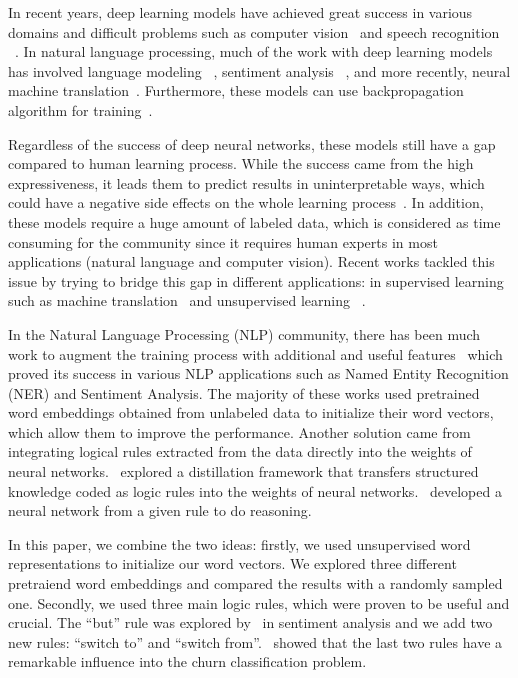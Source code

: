 \documentclass[11pt,letterpaper]{article}
\begin{document}
In recent years, deep learning models have achieved great success in various domains and difficult problems such as computer vision~\cite{krizhevsky} and speech recognition ~\cite{dahl,hinton2012}. In natural language processing, much of the work with deep learning models has involved language modeling ~\cite{bengio2003,mikolov2013}, sentiment analysis ~\cite{socher2013}, and more recently, neural machine translation~\cite{cho,sutskever}. Furthermore, these models can use backpropagation algorithm for training~\cite{rumelhart1988}.

Regardless of the success of deep neural networks, these models still have a gap compared to human learning process. While the success came from the high expressiveness, it leads them to predict results in uninterpretable ways, which could have a negative side effects on the whole learning process~\cite{szegedy,nguyen2015}. In addition, these models require a huge amount of labeled data, which is considered as time consuming for the community since it requires human experts in most applications (natural language and computer vision). Recent works tackled this issue by trying to bridge this gap in different applications: in supervised learning such as machine translation~\cite{wu2016google} and unsupervised learning ~\cite{bengio2015}.

In the Natural Language Processing (NLP) community, there has been much work to augment the training process with additional and useful features~\cite{collobert} which proved its success in various NLP applications such as Named Entity Recognition (NER) and Sentiment Analysis. The majority of these works used pretrained word embeddings obtained from unlabeled data to initialize their word vectors, which allow them to improve the performance. Another solution came from integrating logical rules extracted from the data directly into the weights of neural networks.~\cite{hu} explored a distillation framework that transfers structured knowledge coded as logic rules into the weights of neural networks.~\cite{garcez2012neural} developed a neural network from a given rule to do reasoning. 

In this paper, we combine the two ideas: firstly, we used unsupervised word representations to initialize our word vectors. We explored three different pretraiend word embeddings and compared the results with a randomly sampled one. Secondly, we used three main logic rules, which were proven to be useful and crucial. The \enquote{but} rule was explored by~\cite{hu} in sentiment analysis and we add two new rules: \enquote{switch to} and \enquote{switch from}.~\cite{amiri2016} showed that the last two rules have a remarkable influence into the churn classification problem.
\end{document}
